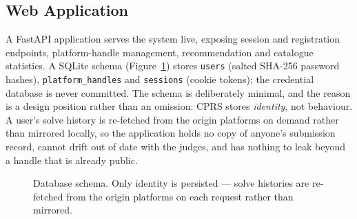 \documentclass[12pt,a4paper]{article}
\begin{document}
\subsection{Web Application}
\label{sec:impl-web}
A FastAPI application serves the system live, exposing session and registration
endpoints, platform-handle management, recommendation and catalogue statistics. A
SQLite schema (Figure~\ref{fig:er}) stores \texttt{users} (salted SHA-256 password
hashes), \texttt{platform\_handles} and \texttt{sessions} (cookie tokens); the credential
database is never committed. The schema is deliberately minimal, and the reason is a
design position rather than an omission: CPRS stores \emph{identity}, not behaviour. A
user's solve history is re-fetched from the origin platforms on demand rather than
mirrored locally, so the application holds no copy of anyone's submission record, cannot
drift out of date with the judges, and has nothing to leak beyond a handle that is
already public.

\begin{figure}[h]
\centering
{}
\caption{Database schema. Only identity is persisted --- solve histories are re-fetched
from the origin platforms on each request rather than mirrored.}
\label{fig:er}
\end{figure}
\end{document}
